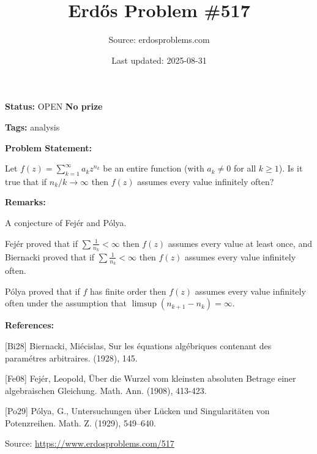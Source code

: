 \documentclass{article}
\title{Erd\H{o}s Problem \#517}
\date{Last updated: 2025-08-31}
\author{Source: erdosproblems.com}
\begin{document}
\maketitle

\noindent\textbf{Status:} OPEN \quad \textbf{No prize}

\noindent\textbf{Tags:} analysis

\medskip
\noindent\textbf{Problem Statement:}

Let $f(z)=\sum_{k=1}^\infty a_kz^{n_k}$ be an entire function (with $a_k\neq 0$ for all $k\geq 1$). Is it true that if $n_k/k\to \infty$ then $f(z)$ assumes every value infinitely often?

\bigskip
\noindent\textbf{Remarks:}

A conjecture of Fej\'{e}r and P\'{o}lya. 

Fej\'{e}r \cite{Fe08} proved that if $\sum\frac{1}{n_k}<\infty$ then $f(z)$ assumes every value at least once, and Biernacki \cite{Bi28} proved that if $\sum\frac{1}{n_k}<\infty$ then $f(z)$ assumes every value infinitely often.

P\'{o}lya \cite{Po29} proved that if $f$ has finite order then $f(z)$ assumes every value infinitely often under the assumption that $\limsup (n_{k+1}-n_k)=\infty$.

\bigskip
\noindent\textbf{References:}

[Bi28] Biernacki, Mi\'{e}cislas, Sur les \'{e}quations alg\'{e}briques contenant des param\'{e}tres arbitraires. (1928), 145.
 
 [Fe08] Fej\'{e}r, Leopold, \"{U}ber die Wurzel vom kleinsten absoluten Betrage einer algebraischen Gleichung. Math. Ann. (1908), 413-423.
 
 [Po29] P\'olya, G., Untersuchungen \"uber {L}\"ucken und Singularit\"{a}ten von
{P}otenzreihen. Math. Z. (1929), 549--640.

\bigskip
\noindent\small{Source: \url{https://www.erdosproblems.com/517}}
\end{document}
